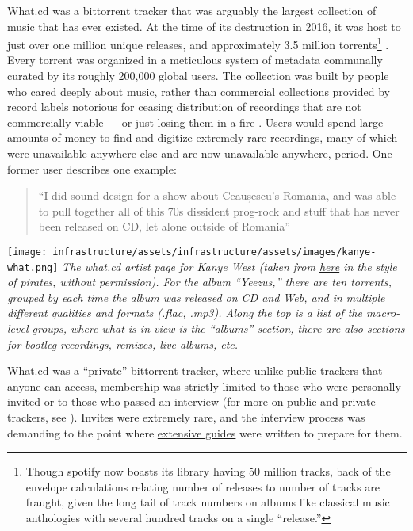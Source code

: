 What.cd was a bittorrent tracker that was arguably the largest
collection of music that has ever existed. At the time of its
destruction in 2016, it was host to just over one million unique
releases, and approximately 3.5 million torrents\footnote{Though spotify
  now boasts its library having 50 million tracks, back of the envelope
  calculations relating number of releases to number of tracks are
  fraught, given the long tail of track numbers on albums like classical
  music anthologies with several hundred tracks on a single ``release.''}
\citep{dunhamWhatCDLegacy2018} . Every torrent was organized in a
meticulous system of metadata communally curated by its roughly 200,000
global users. The collection was built by people who cared deeply about
music, rather than commercial collections provided by record labels
notorious for ceasing distribution of recordings that are not
commercially viable --- or just losing them in a fire \citep{rosenDayMusicBurned2019} . Users would spend large amounts of money
to find and digitize extremely rare recordings, many of which were
unavailable anywhere else and are now unavailable anywhere, period. One
former user describes one example:

\begin{quote}
``I did sound design for a show about Ceaușescu's Romania, and was able
to pull together all of this 70s dissident prog-rock and stuff that has
never been released on CD, let alone outside of Romania'' \citep{sonnadEulogyWhatCd2016} 
\end{quote}

\texttt{[image: infrastructure/assets/infrastructure/assets/images/kanye-what.png]} \emph{The
what.cd artist page for Kanye West (taken from
\href{https://qz.com/840661/what-cd-is-gone-a-eulogy-for-the-greatest-music-collection-in-the-world/}{here}
in the style of pirates, without permission). For the album ``Yeezus,''
there are ten torrents, grouped by each time the album was released on
CD and Web, and in multiple different qualities and formats (.flac,
.mp3). Along the top is a list of the macro-level groups, where what is
in view is the ``albums'' section, there are also sections for bootleg
recordings, remixes, live albums, etc.}

What.cd was a ``private'' bittorrent tracker, where unlike public
trackers that anyone can access, membership was strictly limited to
those who were personally invited or to those who passed an interview
(for more on public and private trackers, see \citep{meulpolderPublicPrivateBitTorrent} ). Invites were extremely rare,
and the interview process was demanding to the point where
\href{https://opentrackers.org/whatinterviewprep.com/index.html}{extensive
guides} were written to prepare for them.

